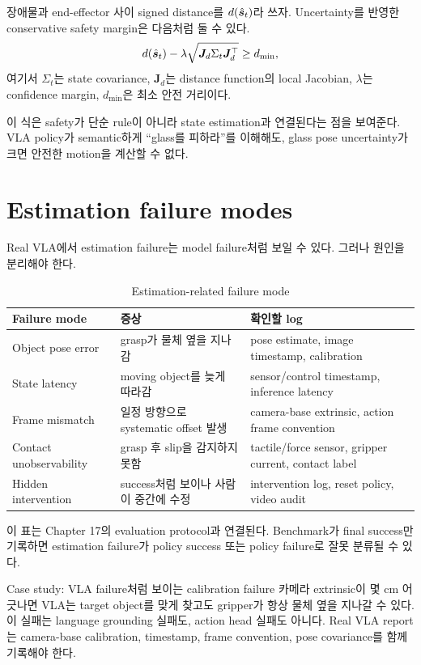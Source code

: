장애물과 end-effector 사이 signed distance를 $d(\hat{\bm{s}}_t)$라 쓰자. Uncertainty를 반영한 conservative safety margin은 다음처럼 둘 수 있다.
\begin{equation}
  d(\hat{\bm{s}}_t) - \lambda \sqrt{\bm{J}_d \Sigma_t \bm{J}_d^\top} \ge d_{\min},
  \label{eq:uncertainty-safety}
\end{equation}
여기서 $\Sigma_t$는 state covariance, $\bm{J}_d$는 distance function의 local Jacobian, $\lambda$는 confidence margin, $d_{\min}$은 최소 안전 거리이다.

이 식은 safety가 단순 rule이 아니라 state estimation과 연결된다는 점을 보여준다. VLA policy가 semantic하게 ``glass를 피하라''를 이해해도, glass pose uncertainty가 크면 안전한 motion을 계산할 수 없다.

\section{Estimation failure modes}

Real VLA에서 estimation failure는 model failure처럼 보일 수 있다. 그러나 원인을 분리해야 한다.

\begin{table}[ht]
\centering
\caption{Estimation-related failure mode}
\label{tab:estimation-failure}
\small
\begin{tabularx}{\textwidth}{p{32mm}X X}
\toprule
Failure mode & 증상 & 확인할 log \\
\midrule
Object pose error & grasp가 물체 옆을 지나감 & pose estimate, image timestamp, calibration \\
State latency & moving object를 늦게 따라감 & sensor/control timestamp, inference latency \\
Frame mismatch & 일정 방향으로 systematic offset 발생 & camera-base extrinsic, action frame convention \\
Contact unobservability & grasp 후 slip을 감지하지 못함 & tactile/force sensor, gripper current, contact label \\
Hidden intervention & success처럼 보이나 사람이 중간에 수정 & intervention log, reset policy, video audit \\
\bottomrule
\end{tabularx}
\end{table}

이 표는 Chapter 17의 evaluation protocol과 연결된다. Benchmark가 final success만 기록하면 estimation failure가 policy success 또는 policy failure로 잘못 분류될 수 있다.

\begin{casebox}{Case study: VLA failure처럼 보이는 calibration failure}
카메라 extrinsic이 몇 cm 어긋나면 VLA는 target object를 맞게 찾고도 gripper가 항상 물체 옆을 지나갈 수 있다. 이 실패는 language grounding 실패도, action head 실패도 아니다. Real VLA report는 camera-base calibration, timestamp, frame convention, pose covariance를 함께 기록해야 한다.
\end{casebox}

